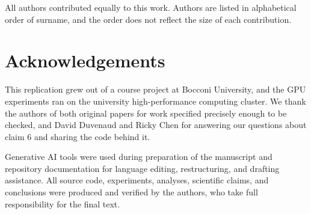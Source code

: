 All authors contributed equally to this work. Authors are listed in alphabetical order
of surname, and the order does not reflect the size of each contribution.

\section*{Acknowledgements}

This replication grew out of a course project at Bocconi University, and the GPU experiments
ran on the university high-performance computing cluster. We thank the authors of both original
papers for work specified precisely enough to be checked, and David Duvenaud and Ricky Chen for answering our questions about
claim 6 and sharing the code behind it.

Generative AI tools were used during preparation of the manuscript and repository documentation
for language editing, restructuring, and drafting assistance. All source code, experiments,
analyses, scientific claims, and conclusions were produced and verified by the authors, who take
full responsibility for the final text.
